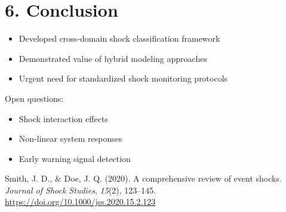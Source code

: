 \documentclass[
]{article}
\newlength{\cslhangindent}
\newenvironment{CSLReferences}[2] %
 {\begin{list}{}{%
  \setlength{\itemindent}{0pt}
  \setlength{\leftmargin}{0pt}
  \setlength{\parsep}{0pt}
  \ifodd #1
   \setlength{\leftmargin}{\cslhangindent}
   \setlength{\itemindent}{-1\cslhangindent}
  \fi
  \setlength{\itemsep}{#2\baselineskip}}}
 {\end{list}}
\begin{document}
\section{6. Conclusion}\label{conclusion}

\begin{itemize}
\item
  Developed cross-domain shock classification framework
\item
  Demonstrated value of hybrid modeling approaches
\item
  Urgent need for standardized shock monitoring protocols
\end{itemize}

Open questions:

\begin{itemize}
\item
  Shock interaction effects
\item
  Non-linear system responses
\item
  Early warning signal detection
\end{itemize}

\label{refs}
\begin{CSLReferences}{1}{0}
Smith, J. D., \& Doe, J. Q. (2020). A comprehensive review of event
shocks. \emph{Journal of Shock Studies}, \emph{15}(2), 123--145.
\url{https://doi.org/10.1000/jss.2020.15.2.123}

\end{CSLReferences}
\end{document}
